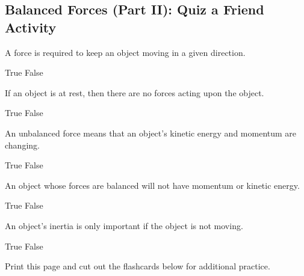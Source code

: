 \documentclass[]{exam}
\begin{document}
\clearpage

\subsection*{Balanced Forces (Part II): Quiz a Friend Activity}

\begin{questions}

\question
A force is required to keep an object moving in a given direction.

\begin{randomizechoices}[norandomize]
    \choice True
    \correctchoice False
\end{randomizechoices}

\question
If an object is at rest, then there are no forces acting upon the object.

\begin{randomizechoices}[norandomize]
    \choice True
    \correctchoice False
\end{randomizechoices}

\question
An unbalanced force means that an object's kinetic energy and momentum are changing.

\begin{randomizechoices}[norandomize]
    \correctchoice True
    \choice False
\end{randomizechoices}

\question
An object whose forces are balanced will not have momentum or kinetic energy.

\begin{randomizechoices}[norandomize]
    \choice True
    \correctchoice False
\end{randomizechoices}

\question
An object's inertia is only important if the object is not moving.

\begin{randomizechoices}[norandomize]
    \choice True
    \correctchoice False
\end{randomizechoices}

\clearpage

\question
Print this page and cut out the flashcards below for additional practice.


\end{questions}
\end{document}
